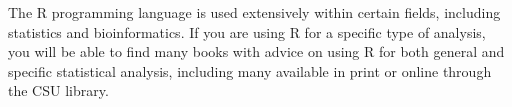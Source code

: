 \documentclass[11pt, a4paper]{article}
\begin{document}
The R programming language is used extensively within certain fields, including statistics and bioinformatics. If you are using R for a specific type of analysis, you will be able to find many books with advice on using R for both general and specific statistical analysis, including many available in print or online through the CSU library. 


\end{document}

